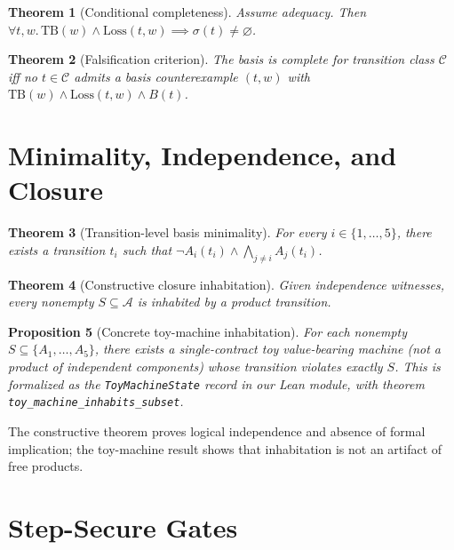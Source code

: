\documentclass[11pt,a4paper]{article}
\newtheorem{theorem}{Theorem}
\newtheorem{proposition}[theorem]{Proposition}
\begin{document}
\begin{theorem}[Conditional completeness]\label{thm:cond-complete}
Assume adequacy. Then $\forall t, w.\, \mathrm{TB}(w) \wedge \mathrm{Loss}(t, w) \implies \sigma(t) \neq \varnothing$.
\end{theorem}

\begin{theorem}[Falsification criterion]\label{thm:falsif}
The basis is complete for transition class $\mathcal{C}$ iff no $t \in \mathcal{C}$ admits a basis counterexample $(t, w)$ with $\mathrm{TB}(w) \wedge \mathrm{Loss}(t, w) \wedge B(t)$.
\end{theorem}

\section{Minimality, Independence, and Closure}\label{sec:minimality}

\begin{theorem}[Transition-level basis minimality]\label{thm:minimality}
For every $i \in \{1, \ldots, 5\}$, there exists a transition $t_i$ such that $\neg A_i(t_i) \wedge \bigwedge_{j \neq i} A_j(t_i)$.
\end{theorem}

\begin{theorem}[Constructive closure inhabitation]\label{thm:closure}
Given independence witnesses, every nonempty $S \subseteq \mathcal{A}$ is inhabited by a product transition.
\end{theorem}

\begin{proposition}[Concrete toy-machine inhabitation]\label{prop:toy-inhabit}
For each nonempty $S \subseteq \{A_1, \ldots, A_5\}$, there exists a single-contract toy value-bearing machine (not a product of independent components) whose transition violates exactly $S$. This is formalized as the \texttt{ToyMachineState} record in our Lean module, with theorem \texttt{toy\_machine\_inhabits\_subset}.
\end{proposition}

The constructive theorem proves logical independence and absence of formal implication; the toy-machine result shows that inhabitation is not an artifact of free products.

\section{Step-Secure Gates}\label{sec:gates}
\end{document}
